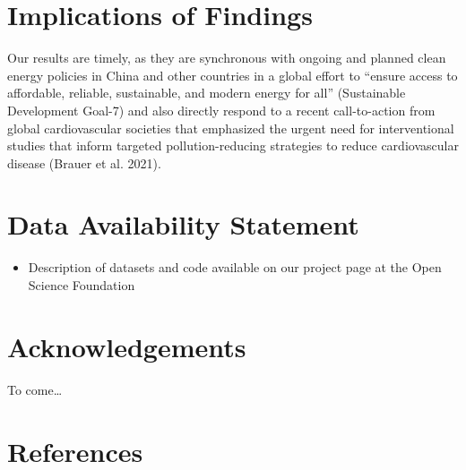 \documentclass[
  letterpaper,
  DIV=11,
  numbers=noendperiod]{scrartcl}
\providecommand{\tightlist}{%
  \setlength{\itemsep}{0pt}\setlength{\parskip}{0pt}}\usepackage{longtable,booktabs,array}
\begin{document}
\hypertarget{implications-of-findings}{%
\section{Implications of Findings}\label{implications-of-findings}}

Our results are timely, as they are synchronous with ongoing and planned
clean energy policies in China and other countries in a global effort to
``ensure access to affordable, reliable, sustainable, and modern energy
for all'' (Sustainable Development Goal-7) and also directly respond to
a recent call-to-action from global cardiovascular societies that
emphasized the urgent need for interventional studies that inform
targeted pollution-reducing strategies to reduce cardiovascular disease
(Brauer et al. 2021).

\hypertarget{data-availability-statement}{%
\section{Data Availability
Statement}\label{data-availability-statement}}

\begin{itemize}
\tightlist
\item
  Description of datasets and code available on our project page at the
  Open Science Foundation
\end{itemize}

\hypertarget{acknowledgements}{%
\section{Acknowledgements}\label{acknowledgements}}

To come\ldots{}

\hypertarget{references}{%
\section{References}\label{references}}
\end{document}
